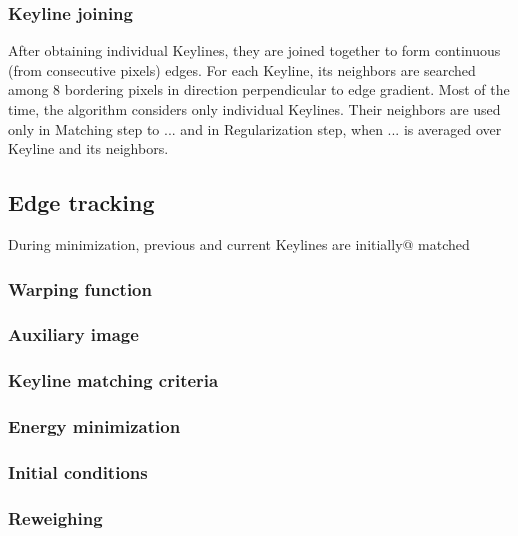 \subsubsection{Keyline joining}

After obtaining individual Keylines, they are joined together to form continuous (from consecutive pixels) edges. %
For each Keyline, its neighbors are searched among 8 bordering pixels in direction perpendicular to edge gradient.
Most of the time, the algorithm considers only individual Keylines. Their neighbors are used only in Matching step to ... %
and in Regularization step, when ... %
is averaged over Keyline and its neighbors.



\subsection{Edge tracking}

During minimization, previous and current Keylines are initially@ matched

\subsubsection{Warping function}

\subsubsection{Auxiliary image}

\subsubsection{Keyline matching criteria}


\subsubsection{Energy minimization}

\subsubsection{Initial conditions}

\subsubsection{Reweighing}



